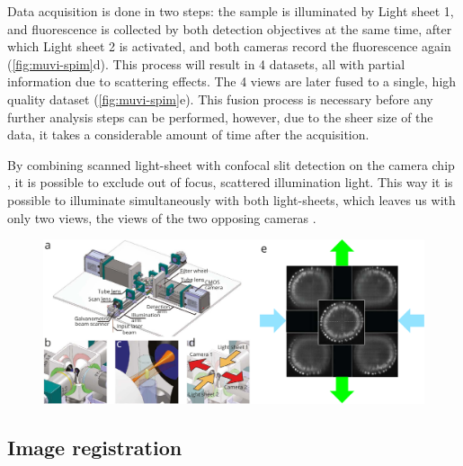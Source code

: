 Data acquisition is done in two steps: the sample is illuminated by Light sheet 1, and fluorescence is collected by both detection objectives at the same time, after which Light sheet 2 is activated, and both cameras record the fluorescence again (\autoref{fig:muvi-spim}d). This process will result in 4 datasets, all with partial information due to scattering effects. The 4 views are later fused to a single, high quality dataset (\autoref{fig:muvi-spim}e). This fusion process is necessary before any further analysis steps can be performed, however, due to the sheer size of the data, it takes a considerable amount of time after the acquisition.

By combining scanned light-sheet \cite{keller_reconstruction_2008} with confocal slit detection on the camera chip \cite{baumgart_scanned_2012}, it is possible to exclude out of focus, scattered illumination light. This way it is  possible to illuminate simultaneously with both light-sheets, which leaves us with only two views, the views of the two opposing cameras \cite{de_medeiros_confocal_2015}.

\begin{figure}
  \centering
  \includegraphics[width=1\columnwidth]{fusion/muvi-spim}
  \label{fig:muvi-spim}
\end{figure}




\subsection{Image registration}

